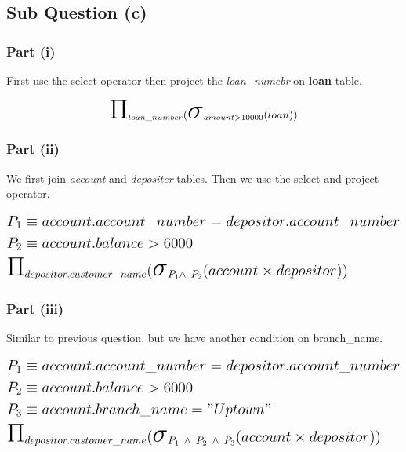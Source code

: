 \documentclass{article}
\newcommand{\bigsigma}{\makebox{\Huge\ensuremath{\sigma}}}
\newcommand{\bigpi}{\makebox{\Huge\ensuremath{\Pi}}}
\begin{document}
\subsection{Sub Question (c)}
\subsubsection{Part (i)}
\hspace{\parindent} First use the select operator then project the \textit{loan\_numebr} on \textbf{loan} table.


\begin{equation}
  \Large \bigpi_{loan\_number} (\bigsigma_{amount>10000}(loan))
\end{equation}

\subsubsection{Part (ii)}
\hspace{\parindent} We first join \textit{account} and \textit{depositer}
tables. Then we use the select and project operator.


\begin{equation}
  \Large 
    \begin{split}
       & P_1 \equiv  account.account\_number = depositor.account\_number \\
       & P_2 \equiv  account.balance > 6000 \\
       & \bigpi_{depositor.customer\_name}  (\bigsigma_{P_1 \wedge \ P_2}(account \times depositor))
    \end{split}
\end{equation}

\subsubsection{Part (iii)}
\hspace{\parindent} Similar to previous question, but we have another condition on branch\_name.


\begin{equation}
  \Large 
    \begin{split}
       & P_1 \equiv  account.account\_number = depositor.account\_number \\
       & P_2 \equiv  account.balance > 6000 \\
       & P_3 \equiv  account.branch\_name = "Uptown" \\
       & \bigpi_{depositor.customer\_name}  (\bigsigma_{P_1 \ \wedge \ P_2 \ \wedge \ P_3 }(account \times depositor))
    \end{split}
\end{equation}
\end{document}
